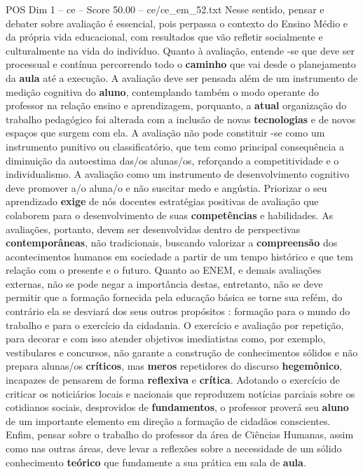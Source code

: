 \begin{textsample}{POS Dim 1 – ce – Score 50.00 – ce/ce\_em\_52.txt}
Nesse sentido, pensar e debater sobre avaliação é essencial, pois perpassa o contexto do Ensino Médio e da própria vida educacional, com resultados que vão refletir socialmente e culturalmente na vida do indivíduo.
Quanto à avaliação, entende -se que deve ser processual e contínua percorrendo todo o \textbf{caminho} que vai desde o planejamento da \textbf{aula} até a execução.
A avaliação deve ser pensada além de um instrumento de medição cognitiva do \textbf{aluno}, contemplando também o modo operante do professor na relação ensino e aprendizagem, porquanto, a \textbf{atual} organização do trabalho pedagógico foi alterada com a inclusão de novas \textbf{tecnologias} e de novos espaços que surgem com ela.
A avaliação não pode constituir -se como um instrumento punitivo ou classificatório, que tem como principal consequência a diminuição da autoestima das/os alunas/os, reforçando a competitividade e o individualismo.
A avaliação como um instrumento de desenvolvimento cognitivo deve promover a/o aluna/o e não suscitar medo e angústia.
Priorizar o seu aprendizado \textbf{exige} de nós docentes estratégias positivas de avaliação que colaborem para o desenvolvimento de suas \textbf{competências} e habilidades.
As avaliações, portanto, devem ser desenvolvidas dentro de perspectivas \textbf{contemporâneas}, não tradicionais, buscando valorizar a \textbf{compreensão} dos acontecimentos humanos em sociedade a partir de um tempo histórico e que tem relação com o presente e o futuro.
Quanto ao ENEM, e demais avaliações externas, não se pode negar a importância destas, entretanto, não se deve permitir que a formação fornecida pela educação básica se torne sua refém, do contrário ela se desviará dos seus outros propósitos : formação para o mundo do trabalho e para o exercício da cidadania.
O exercício e avaliação por repetição, para decorar e com isso atender objetivos imediatistas como, por exemplo, vestibulares e concursos, não garante a construção de conhecimentos sólidos e não prepara alunas/os \textbf{críticos}, mas \textbf{meros} repetidores do discurso \textbf{hegemônico}, incapazes de pensarem de forma \textbf{reflexiva} e \textbf{crítica}.
Adotando o exercício de criticar os noticiários locais e nacionais que reproduzem notícias parciais sobre os cotidianos sociais, desprovidos de \textbf{fundamentos}, o professor proverá seu \textbf{aluno} de um importante elemento em direção a formação de cidadãos conscientes.
Enfim, pensar sobre o trabalho do professor da área de Ciências Humanas, assim como nas outras áreas, deve levar a reflexões sobre a necessidade de um sólido conhecimento \textbf{teórico} que fundamente a sua prática em sala de \textbf{aula}.

\end{textsample}

